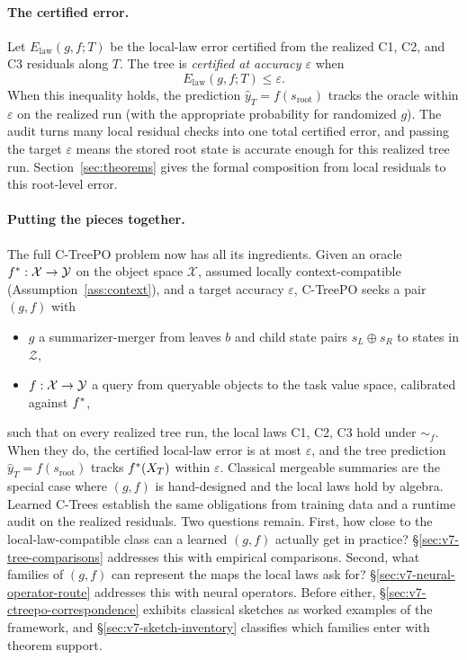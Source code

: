 \paragraph{The certified error.}
Let \(E_{\mathrm{law}}(g,f;T)\) be the local-law error certified from
the realized C1, C2, and C3 residuals along \(T\). The tree is
\emph{certified at accuracy \(\varepsilon\)} when
\[
  E_{\mathrm{law}}(g,f;T)\le\varepsilon .
\]
When this inequality holds, the prediction
\(\widehat y_T=f(s_{\mathrm{root}})\) tracks the oracle within
\(\varepsilon\) on the realized run (with the appropriate probability
for randomized \(g\)). The audit turns many local residual checks
into one total certified error, and passing the target
\(\varepsilon\) means the stored root state is accurate enough for
this realized tree run. Section~\ref{sec:theorems} gives the formal
composition from local residuals to this root-level error.

\paragraph{Putting the pieces together.}
The full C-TreePO problem now has all its ingredients. Given an oracle
\(f^\ast:\mathcal{X}\to\mathcal{Y}\) on the object space \(\mathcal{X}\),
assumed locally context-compatible (Assumption~\ref{ass:context}), and a
target accuracy \(\varepsilon\), C-TreePO seeks a pair \((g,f)\) with
\begin{itemize}[leftmargin=1.5em,nosep]
\item \(g\) a summarizer-merger from leaves \(b\) and child state pairs
\(s_L\oplus s_R\) to states in \(\mathcal{Z}\),
\item \(f:\mathcal X\to\mathcal{Y}\) a query from queryable objects to the task
value space, calibrated
against \(f^\ast\),
\end{itemize}
such that on every realized tree run, the local laws C1, C2, C3 hold
under \(\sim_f\). When they do, the certified local-law error is at
most \(\varepsilon\), and the tree prediction
\(\widehat y_T = f(s_{\mathrm{root}})\) tracks \(f^\ast(X_T)\) within
\(\varepsilon\). Classical mergeable summaries are the special case
where \((g,f)\) is hand-designed and the local laws hold by algebra.
Learned C-Trees establish the same obligations from training data and
a runtime audit on the realized residuals. Two questions remain.
First, how close to the local-law-compatible class can a learned
\((g,f)\) actually get in practice?
\S\ref{sec:v7-tree-comparisons} addresses this with empirical
comparisons. Second, what families of \((g,f)\) can represent the
maps the local laws ask for?
\S\ref{sec:v7-neural-operator-route} addresses this with neural
operators. Before either,
\S\ref{sec:v7-ctreepo-correspondence} exhibits classical sketches as
worked examples of the framework, and
\S\ref{sec:v7-sketch-inventory} classifies which families enter with
theorem support.

